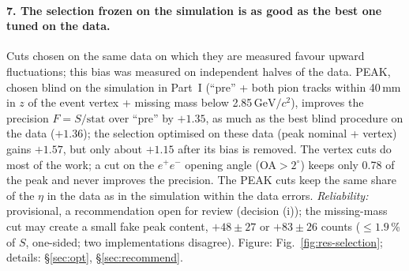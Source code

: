 \documentclass[11pt,a4paper]{article}
\newcommand{\ee}{\ensuremath{e^{+}e^{-}}\xspace}
\newcommand{\GeVcc}{\ensuremath{\mathrm{GeV}/c^{2}}\xspace}
\begin{document}
\paragraph{7. The selection frozen on the simulation is as good as the best one tuned on the data.} Cuts chosen on the same data on
which they are measured favour upward fluctuations; this bias was measured on independent halves of the data. PEAK, chosen blind on
the simulation in Part~I (``pre'' + both pion tracks within 40\,mm in $z$ of the event vertex + missing mass below 2.85\,\GeVcc),
improves the precision $F=S/\mathrm{stat}$ over ``pre'' by $+1.35$, as much as the best blind procedure on the data ($+1.36$); the selection
optimised on these data (peak nominal + vertex) gains $+1.57$, but only about $+1.15$ after its bias is removed. The vertex cuts do
most of the work; a cut on the \ee opening angle (OA$>2^\circ$) keeps only 0.78 of the peak and never improves the precision. The PEAK cuts keep the same share of the
$\eta$ in the data as in the simulation within the data errors. \emph{Reliability:} provisional, a recommendation open for review (decision (i));
the missing-mass cut may create a small fake peak content, $+48\pm27$ or $+83\pm26$ counts ($\le1.9$\,\% of $S$, one-sided; two
implementations disagree). Figure: Fig.~\ref{fig:res-selection}; details: \S\ref{sec:opt}, \S\ref{sec:recommend}.
\end{document}
